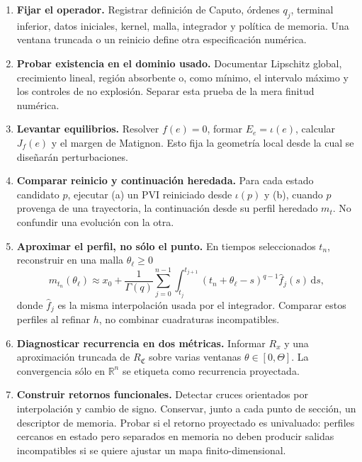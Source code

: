 \begin{enumerate}[label=\textbf{C\arabic*.}]
 \item \textbf{Fijar el operador.} Registrar definición de Caputo, órdenes
 \(q_j\), terminal inferior, datos iniciales, kernel, malla, integrador y
 política de memoria. Una ventana truncada o un reinicio define otra
 especificación numérica.

 \item \textbf{Probar existencia en el dominio usado.} Documentar Lipschitz
 global, crecimiento lineal, región absorbente o, como mínimo, el intervalo
 máximo y los controles de no explosión. Separar esta prueba de la mera
 finitud numérica.

 \item \textbf{Levantar equilibrios.} Resolver \(f(e)=0\), formar
 \(E_e=\iota(e)\), calcular \(J_f(e)\) y el margen de Matignon. Esto fija la
 geometría local desde la cual se diseñarán perturbaciones.

 \item \textbf{Comparar reinicio y continuación heredada.} Para cada estado candidato \(p\),
 ejecutar (a) un PVI reiniciado desde \(\iota(p)\) y (b), cuando \(p\) provenga
 de una trayectoria, la continuación desde su perfil heredado \(m_t\). No
 confundir una evolución con la otra.

 \item \textbf{Aproximar el perfil, no sólo el punto.} En tiempos seleccionados
 \(t_n\), reconstruir en una malla \(\theta_\ell\geq0\)
 \begin{equation}
  m_{t_n}(\theta_\ell)\approx x_0+
  \frac1{\Gamma(q)}\sum_{j=0}^{n-1}
  \int_{t_j}^{t_{j+1}}
  (t_n+\theta_\ell-s)^{q-1}\widehat f_j(s)\,\mathrm ds,
  \label{eq:geofo-discrete-profile}
 \end{equation}
 donde \(\widehat f_j\) es la misma interpolación usada por el integrador.
 Comparar estos perfiles al refinar \(h\), no combinar cuadraturas
 incompatibles.

 \item \textbf{Diagnosticar recurrencia en dos métricas.} Informar
 \(R_x\) y una aproximación truncada de \(R_{\mathfrak C}\) sobre varias
 ventanas \(\theta\in[0,\Theta]\). La convergencia sólo en \(\mathbb R^n\) se
 etiqueta como recurrencia proyectada.

 \item \textbf{Construir retornos funcionales.} Detectar cruces orientados por
 interpolación y cambio de signo. Conservar, junto a cada punto de sección, un
 descriptor de memoria. Probar si el retorno proyectado es univaluado:
 perfiles cercanos en estado pero separados en memoria no deben producir
 salidas incompatibles si se quiere ajustar un mapa finito-dimensional.


\end{enumerate}
